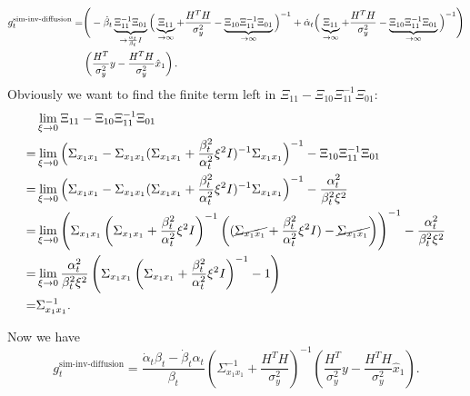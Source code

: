 \begin{align}
    \nonumber g_t^{\text{sim-inv-diffusion}} =& \Bigg{(}-\dot\beta_t \underbrace{\Xi_{11}^{-1}\Xi_{01}}_{\rightarrow \frac{\alpha_t}{\beta_t} I } \Big{(}\underbrace{\Xi_{11}}_{\rightarrow \infty} + \frac{H^TH}{\sigma_y^2}-\underbrace{\Xi_{10}\Xi_{11}^{-1}\Xi_{01}}_{\rightarrow \infty}\Big{)}^{-1}
    +\dot\alpha_t \Big{(}\underbrace{\Xi_{11}}_{\rightarrow \infty} + \frac{H^TH}{\sigma_y^2}-\underbrace{\Xi_{10}\Xi_{11}^{-1}\Xi_{01}}_{\rightarrow \infty} \Big{)}^{-1}\Bigg{)}\\
    &\left(\frac{H^T}{\sigma_y^2}y - \frac{H^TH}{\sigma_y^2} \hat{x}_1\right).
\end{align}
Obviously we want to find the finite term left in $\Xi_{11} - \Xi_{10}\Xi_{11}^{-1}\Xi_{01}$:
\begin{align}
    \nonumber &\lim_{\xi\rightarrow 0}\Xi_{11} - \Xi_{10}\Xi_{11}^{-1}\Xi_{01} \\
    \nonumber =&\lim_{\xi\rightarrow 0}\Big{(} \Sigma_{x_1 x_1} - \Sigma_{x_1 x_1} (\Sigma_{x_1 x_1} +\frac{\beta_t^2}{\alpha_t^2}\xi^2 I)^{-1} \Sigma_{x_1 x_1} \Big{)}^{-1} - \Xi_{10}\Xi_{11}^{-1}\Xi_{01}\\
    \nonumber =&\lim_{\xi\rightarrow 0}\Big{(} \Sigma_{x_1 x_1} - \Sigma_{x_1 x_1} (\Sigma_{x_1 x_1} +\frac{\beta_t^2}{\alpha_t^2}\xi^2 I)^{-1} \Sigma_{x_1 x_1} \Big{)}^{-1} - \frac{\alpha_t^2}{\beta_t^2\xi^2} \\
    \nonumber =&\lim_{\xi\rightarrow 0}\left( \Sigma_{x_1 x_1}\left(
    \Sigma_{x_1 x_1} +\frac{\beta_t^2}{\alpha_t^2}\xi^2 I\right)^{-1}
    \left(
    (\cancel{\Sigma_{x_1 x_1}} +\frac{\beta_t^2}{\alpha_t^2}\xi^2 I)
    - \cancel{\Sigma_{x_1 x_1}}
    \right)
    \right)^{-1} - \frac{\alpha_t^2}{\beta_t^2\xi^2}\\
    \nonumber =&\lim_{\xi\rightarrow 0}
    \frac{\alpha_t^2}{\beta_t^2\xi^2}
    \left(
    \Sigma_{x_1 x_1}\left(
    \Sigma_{x_1 x_1} +\frac{\beta_t^2}{\alpha_t^2}\xi^2 I\right)^{-1}
    -1
    \right)
    \\
    =&\Sigma_{x_1 x_1}^{-1}. 
\end{align}

Now we have 
\begin{equation}
    g_t^{\text{sim-inv-diffusion}} = \frac{\dot \alpha_t \beta_t - \dot\beta_t\alpha_t}{\beta_t} \left(
    \Sigma_{x_1 x_1}^{-1} + \frac{H^TH}{\sigma_y^2}
    \right)^{-1}
    \left(
    \frac{H^T}{\sigma_y^2}y - \frac{H^TH}{\sigma_y^2} \hat{x}_1
    \right).
\end{equation}

